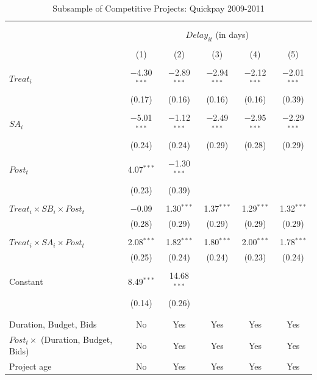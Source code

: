 \documentclass[
]{article}
\begin{document}
\begin{table}[H] \centering 
  \caption{Subsample of Competitive Projects: Quickpay 2009-2011} 
  \label{} 
\small 
\begin{tabular}{@{\extracolsep{-2pt}}lccccc} 
\\[-1.8ex]\hline 
\hline \\[-1.8ex] 
\\[-1.8ex] & \multicolumn{5}{c}{$Delay_{it}$ (in days)} \\ 
\\[-1.8ex] & (1) & (2) & (3) & (4) & (5)\\ 
\hline \\[-1.8ex] 
 $Treat_i$ & $-$4.30$^{***}$ & $-$2.89$^{***}$ & $-$2.94$^{***}$ & $-$2.12$^{***}$ & $-$2.01$^{***}$ \\ 
  & (0.17) & (0.16) & (0.16) & (0.16) & (0.39) \\ 
  & & & & & \\ 
 $SA_i$ & $-$5.01$^{***}$ & $-$1.12$^{***}$ & $-$2.49$^{***}$ & $-$2.95$^{***}$ & $-$2.29$^{***}$ \\ 
  & (0.24) & (0.24) & (0.29) & (0.28) & (0.29) \\ 
  & & & & & \\ 
 $Post_t$ & 4.07$^{***}$ & $-$1.30$^{***}$ &  &  &  \\ 
  & (0.23) & (0.39) &  &  &  \\ 
  & & & & & \\ 
 $Treat_i \times SB_i \times Post_t$ & $-$0.09 & 1.30$^{***}$ & 1.37$^{***}$ & 1.29$^{***}$ & 1.32$^{***}$ \\ 
  & (0.28) & (0.29) & (0.29) & (0.29) & (0.29) \\ 
  & & & & & \\ 
 $Treat_i \times SA_i \times Post_t$ & 2.08$^{***}$ & 1.82$^{***}$ & 1.80$^{***}$ & 2.00$^{***}$ & 1.78$^{***}$ \\ 
  & (0.25) & (0.24) & (0.24) & (0.23) & (0.24) \\ 
  & & & & & \\ 
 Constant & 8.49$^{***}$ & 14.68$^{***}$ &  &  &  \\ 
  & (0.14) & (0.26) &  &  &  \\ 
  & & & & & \\ 
\hline \\[-1.8ex] 
Duration, Budget, Bids & No & Yes & Yes & Yes & Yes \\ 
$Post_t \times $  (Duration, Budget, Bids) & No & Yes & Yes & Yes & Yes \\ 
Project age & No & Yes & Yes & Yes & Yes \\ 

\end{tabular}
\end{table}
\end{document}
